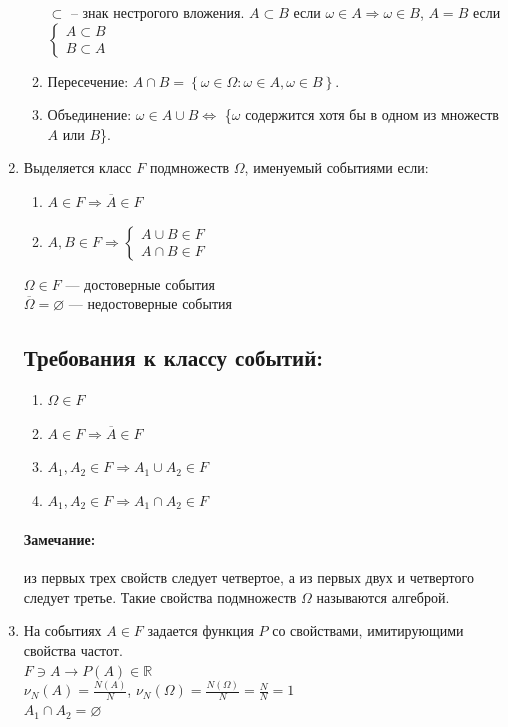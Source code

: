 \documentclass[a4paper, 12pt]{article}
\theoremstyle{definition}
\begin{document}
\begin{enumerate}
\begin{enumerate}
\begin{figure}[h]
		\end{figure}
		\par
		$\subset$ – знак нестрогого вложения. $A\subset B$ если $\omega \in A\Rightarrow\omega\in B$, $A=B$ если $\begin{cases}
				A\subset B\\
				B\subset A
				\end{cases}$
		\item Пересечение: $A\cap B=\left\{\omega\in\Omega:\omega\in A, \omega \in B\right\}$.
		\item Объединение: $\omega\in A\cup B\Leftrightarrow$ \{$\omega$ содержится хотя бы в одном из множеств $A$ или $B$\}.
	\end{enumerate}
	\item Выделяется класс $F$ подмножеств $\Omega$, именуемый событиями если:
		\begin{enumerate}
			\item $A\in F \Rightarrow \overline{A}\in F$
			\item $A,B\in F\Rightarrow 
					\begin{cases}
					A\cup B \in F\\
					A\cap B \in F
					\end{cases}$
		\end{enumerate}
		$\Omega\in F$ — достоверные события\\
		$\overline{\Omega}=\varnothing$ — недостоверные события\\
		\subsection{Требования к классу событий:}
		\begin{enumerate}
		\item $\Omega \in F$
		\item $A\in F\Rightarrow \overline{A}\in F$
		\item $A_1,A_2\in F\Rightarrow A_1\cup A_2\in F$
		\item $A_1,A_2\in F\Rightarrow A_1\cap A_2\in F$
		\end{enumerate}
		\paragraph{Замечание:} из первых трех свойств следует четвертое, а из первых двух и четвертого следует третье. Такие свойства подмножеств $\Omega$ называются алгеброй.
		\item На событиях $A\in F$ задается функция $P$ со свойствами, имитирующими свойства частот.\\
		$F\ni A\longrightarrow P\left(A\right)\in\mathbb{R}$\\
		$\nu_N(A)=\frac{N(A)}{N}$, $\nu_N(\Omega)=\frac{N(\Omega)}{N}=\frac{N}{N}=1$\\
		$A_1\cap A_2=\varnothing$\\

\end{enumerate}
\end{document}

